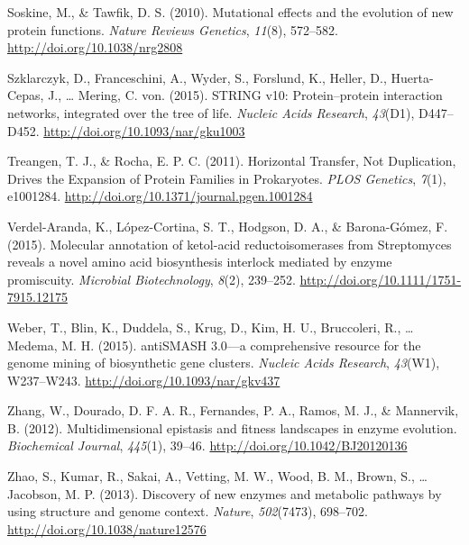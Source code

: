 \documentclass[12pt,twoside]{reedthesis}
\begin{document}
  \hypertarget{ref-soskineux5fmutationalux5f2010}{}
  Soskine, M., \& Tawfik, D. S. (2010). Mutational effects and the
  evolution of new protein functions. \emph{Nature Reviews Genetics},
  \emph{11}(8), 572--582. \url{http://doi.org/10.1038/nrg2808}
  
  \hypertarget{ref-szklarczykux5fstringux5f2015}{}
  Szklarczyk, D., Franceschini, A., Wyder, S., Forslund, K., Heller, D.,
  Huerta-Cepas, J., \ldots{} Mering, C. von. (2015). STRING v10:
  Protein--protein interaction networks, integrated over the tree of life.
  \emph{Nucleic Acids Research}, \emph{43}(D1), D447--D452.
  \url{http://doi.org/10.1093/nar/gku1003}
  
  \hypertarget{ref-treangenux5fhorizontalux5f2011}{}
  Treangen, T. J., \& Rocha, E. P. C. (2011). Horizontal Transfer, Not
  Duplication, Drives the Expansion of Protein Families in Prokaryotes.
  \emph{PLOS Genetics}, \emph{7}(1), e1001284.
  \url{http://doi.org/10.1371/journal.pgen.1001284}
  
  \hypertarget{ref-verdel-arandaux5fmolecularux5f2015}{}
  Verdel-Aranda, K., López-Cortina, S. T., Hodgson, D. A., \&
  Barona-Gómez, F. (2015). Molecular annotation of ketol-acid
  reductoisomerases from Streptomyces reveals a novel amino acid
  biosynthesis interlock mediated by enzyme promiscuity. \emph{Microbial
  Biotechnology}, \emph{8}(2), 239--252.
  \url{http://doi.org/10.1111/1751-7915.12175}
  
  \hypertarget{ref-weberux5fantismashux5f2015}{}
  Weber, T., Blin, K., Duddela, S., Krug, D., Kim, H. U., Bruccoleri, R.,
  \ldots{} Medema, M. H. (2015). antiSMASH 3.0---a comprehensive resource
  for the genome mining of biosynthetic gene clusters. \emph{Nucleic Acids
  Research}, \emph{43}(W1), W237--W243.
  \url{http://doi.org/10.1093/nar/gkv437}
  
  \hypertarget{ref-zhangux5fmultidimensionalux5f2012}{}
  Zhang, W., Dourado, D. F. A. R., Fernandes, P. A., Ramos, M. J., \&
  Mannervik, B. (2012). Multidimensional epistasis and fitness landscapes
  in enzyme evolution. \emph{Biochemical Journal}, \emph{445}(1), 39--46.
  \url{http://doi.org/10.1042/BJ20120136}
  
  \hypertarget{ref-zhaoux5fdiscoveryux5f2013}{}
  Zhao, S., Kumar, R., Sakai, A., Vetting, M. W., Wood, B. M., Brown, S.,
  \ldots{} Jacobson, M. P. (2013). Discovery of new enzymes and metabolic
  pathways by using structure and genome context. \emph{Nature},
  \emph{502}(7473), 698--702. \url{http://doi.org/10.1038/nature12576}
  
\end{document}
